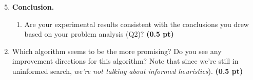 \documentclass[11pt,a4paper]{report}
\begin{document}
\begin{enumerate}
	\setcounter{enumi}{4}
	\item \textbf{Conclusion.}
	\begin{enumerate}
		\item Are your experimental results consistent with the conclusions you drew
		based on your problem analysis (Q2)? \textbf{(0.5 pt)}
	\end{enumerate}
\end{enumerate}
\begin{answers}[4cm]
\end{answers}

\begin{enumerate}
	\setcounter{enumi}{4}
	\begin{enumerate}
		\setcounter{enumii}{1}
		\item Which algorithm seems to be the more promising? Do you see any improvement directions for this algorithm? Note that since we're still in uninformed search, \textit{we're not talking about informed heuristics}). \textbf{(0.5 pt)}
	\end{enumerate}
\end{enumerate}
\begin{answers}[4cm]
\end{answers}
\end{document}
